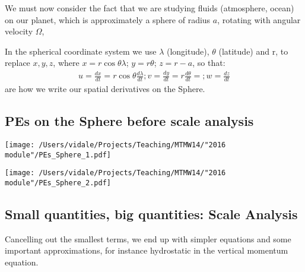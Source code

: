 We must now consider the fact that we are studying fluids (atmosphere, ocean) on our planet, which is approximately a sphere of radius $a$, rotating with angular velocity $\Omega$,

\begin{minipage}{0.4\textwidth}
\end{minipage} \hfill

\begin{minipage}{0.55\textwidth}
	In the spherical coordinate system we use $\lambda$ (longitude), $\theta$ (latitude) and r, to replace $x,y,z$, where $x=r \cos{\theta} \lambda$; $y=r\theta$; $z=r-a$, so that:
	\begin{eqnarray}
		u=\frac {dx}{dt}=r \cos{\theta} \frac {d \lambda}{d t} ; v=\frac {dy}{dt}= r\frac {d\theta}{dt}= ; w=\frac {dz }{dt }
	\end{eqnarray}
	are how we write our spatial derivatives on the Sphere.	
\end{minipage}

\subsection{PEs on the Sphere before scale analysis}
\texttt{[image: /Users/vidale/Projects/Teaching/MTMW14/"2016 module"/PEs\_Sphere\_1.pdf]}
\label{fig:Spherical-PEs1}

\texttt{[image: /Users/vidale/Projects/Teaching/MTMW14/"2016 module"/PEs\_Sphere\_2.pdf]}
\label{fig:Spherical-PEs2}


\subsection{Small quantities, big quantities: Scale Analysis}

Cancelling out the smallest terms, we end up with simpler equations and some important approximations, for instance hydrostatic in the vertical momentum equation.

